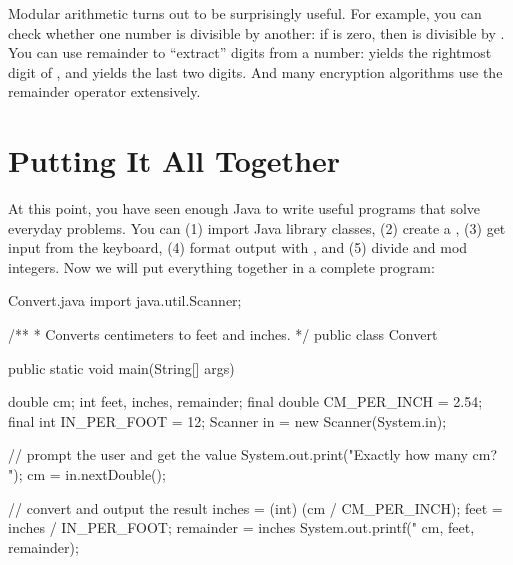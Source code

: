 

Modular arithmetic turns out to be surprisingly useful.
For example, you can check whether one number is divisible by another: if  is zero, then  is divisible by .
You can use remainder to ``extract'' digits from a number:  yields the rightmost digit of , and  yields the last two digits.
And many encryption algorithms use the remainder operator extensively.


\section{Putting It All Together}

At this point, you have seen enough Java to write useful programs that solve everyday problems.
You can (1) import Java library classes, (2) create a , (3) get input from the keyboard, (4) format output with , and (5) divide and mod integers.
Now we will put everything together in a complete program:



\begin{trinket}{Convert.java}
import java.util.Scanner;

/**
 * Converts centimeters to feet and inches.
 */
public class Convert {

    public static void main(String[] args) {
        double cm;
        int feet, inches, remainder;
        final double CM_PER_INCH = 2.54;
        final int IN_PER_FOOT = 12;
        Scanner in = new Scanner(System.in);

        // prompt the user and get the value
        System.out.print("Exactly how many cm? ");
        cm = in.nextDouble();

        // convert and output the result
        inches = (int) (cm / CM_PER_INCH);
        feet = inches / IN_PER_FOOT;
        remainder = inches %
        System.out.printf("%
                          cm, feet, remainder);
    }
}
\end{trinket}

